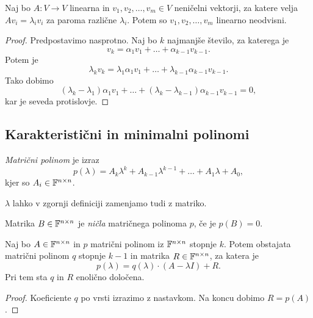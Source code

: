 \documentclass[12pt, a4paper]{article}
\begin{document}
\begin{trditev}
Naj bo $A\colon V\to V$ linearna in $v_1,v_2,\dots,v_m\in V$ neničelni vektorji, za katere velja $Av_i=\lambda_i v_i$ za paroma različne $\lambda_i$. Potem so $v_1,v_2,\dots,v_m$ linearno neodvisni.
\end{trditev}

\begin{proof}
Predpostavimo nasprotno. Naj bo $k$ najmanjše število, za katerega je
\[
v_k=\alpha_1v_1+\dots+\alpha_{k-1}v_{k-1}.
\]
Potem je
\[
\lambda_kv_k=\lambda_1\alpha_1v_1+\dots+\lambda_{k-1}\alpha_{k-1}v_{k-1}.
\]
Tako dobimo
\[
(\lambda_k-\lambda_1)\alpha_1v_1+\dots+(\lambda_k-\lambda_{k-1})\alpha_{k-1}v_{k-1}=0,
\]
kar je seveda protislovje.
\end{proof}

\newpage

\subsection{Karakteristični in minimalni polinomi}

\begin{okvir}
\begin{definicija}
\emph{Matrični polinom} je izraz
\[
p(\lambda)=A_k\lambda^k+A_{k-1}\lambda^{k-1}+\dots+A_1\lambda+A_0,
\]
kjer so $A_i\in\mathbb{F}^{n\times n}$.
\end{definicija}
\end{okvir}

\begin{opomba}
$\lambda$ lahko v zgornji definiciji zamenjamo tudi z matriko.
\end{opomba}

\begin{definicija}
Matrika $B\in\mathbb{F}^{n\times n}$ je \emph{ničla} matričnega polinoma $p$, če je $p(B)=0$.
\end{definicija}

\begin{izrek}[Bezout]
Naj bo $A\in\mathbb{F}^{n\times n}$ in $p$ matrični polinom iz $\mathbb{F}^{n\times n}$ stopnje $k$. Potem obstajata matrični polinom $q$ stopnje $k-1$ in matrika $R\in\mathbb{F}^{n\times n}$, za katera je
\[
p(\lambda)=q(\lambda)\cdot(A-\lambda I)+R.
\]
Pri tem sta $q$ in $R$ enolično določena.
\end{izrek}

\begin{proof}
Koeficiente $q$ po vrsti izrazimo z nastavkom. Na koncu dobimo $R=p(A)$.
\end{proof}
\end{document}
